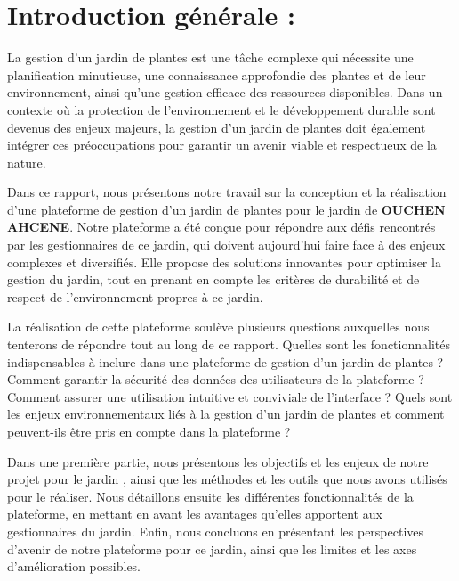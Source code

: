 \documentclass[a4paper,12pt,oneside]{article}
\begin{document}
\newpage
\tableofcontents
\newpage
\listoffigures
\newpage
\listoftables

\newpage




\section{Introduction générale :}

{\fontsize{15}{20}\selectfont 

\hspace{1cm}La gestion d'un jardin de plantes est une tâche complexe qui nécessite une planification minutieuse, une connaissance approfondie des plantes et de leur environnement, ainsi qu'une gestion efficace des ressources disponibles. Dans un contexte où la protection de l'environnement et le développement durable sont devenus des enjeux majeurs, la gestion d'un jardin de plantes doit également intégrer ces préoccupations pour garantir un avenir viable et respectueux de la nature.
\vskip1mm

Dans ce rapport, nous présentons notre travail sur la conception et la réalisation d'une plateforme de gestion d'un jardin de plantes pour le jardin de \textbf{OUCHEN AHCENE}. Notre plateforme a été conçue pour répondre aux défis rencontrés par les gestionnaires de ce jardin, qui doivent aujourd'hui faire face à des enjeux complexes et diversifiés. Elle propose des solutions innovantes pour optimiser la gestion du jardin, tout en prenant en compte les critères de durabilité et de respect de l'environnement propres à ce jardin.

La réalisation de cette plateforme soulève plusieurs questions auxquelles nous tenterons de répondre tout au long de ce rapport. Quelles sont les fonctionnalités indispensables à inclure dans une plateforme de gestion d'un jardin de plantes ? Comment garantir la sécurité des données des utilisateurs de la plateforme ? Comment assurer une utilisation intuitive et conviviale de l'interface ? Quels sont les enjeux environnementaux liés à la gestion d'un jardin de plantes et comment peuvent-ils être pris en compte dans la plateforme ?
\vskip1mm

Dans une première partie, nous présentons les objectifs et les enjeux de notre projet pour le jardin , ainsi que les méthodes et les outils que nous avons utilisés pour le réaliser. Nous détaillons ensuite les différentes fonctionnalités de la plateforme, en mettant en avant les avantages qu'elles apportent aux gestionnaires du jardin. Enfin, nous concluons en présentant les perspectives d'avenir de notre plateforme pour ce jardin, ainsi que les limites et les axes d'amélioration possibles.
\vskip1mm

}
\end{document}
